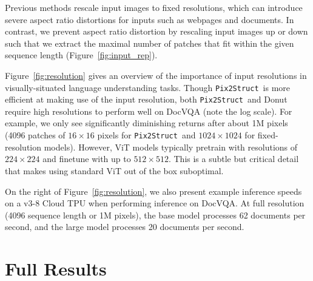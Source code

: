 \documentclass{article} \usepackage[accepted]{icml2023}
\newcommand\ourmodel{{\texttt{Pix2Struct}}}
\begin{document}
Previous methods rescale input images to fixed resolutions, which can introduce severe aspect ratio distortions for inputs such as webpages and documents. In contrast, we prevent aspect ratio distortion by rescaling input images  up or down such that we extract the maximal number of patches that fit within the given sequence length (Figure~\ref{fig:input_rep}).  

Figure~\ref{fig:resolution} gives an overview of the importance of input resolutions in visually-situated language understanding tasks. Though \ourmodel~is more efficient at making use of the input resolution, both \ourmodel~and Donut require high resolutions to perform well on DocVQA (note the log scale). For example, we only see significantly diminishing returns after about 1M pixels (4096 patches of $16\times16$ pixels for \ourmodel~and $1024\times1024$ for fixed-resolution models). However, ViT models typically pretrain with resolutions of $224\times224$ and finetune with up to $512\times512$. This is a subtle but critical detail that makes using standard ViT out of the box suboptimal.

On the right of Figure~\ref{fig:resolution}, we also present example inference speeds on a v3-8 Cloud TPU when performing inference on DocVQA. At full resolution (4096 sequence length or 1M pixels), the base model processes 62 documents per second, and the large model processes 20 documents per second.

\clearpage
\section{Full Results}
\label{sec:full_results}
\end{document}
